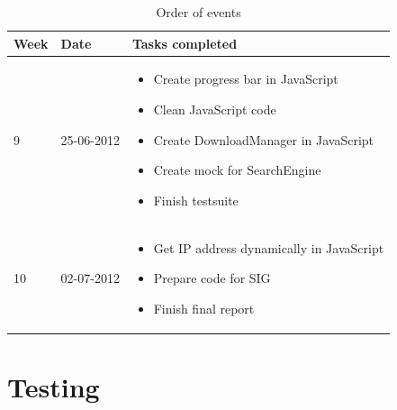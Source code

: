 \begin{table}
\centering
	\begin{tabular}{| l | l | p{8 cm} |}
		\hline
		Week & Date & Tasks completed \\
		\hline
		\hline
		9 & 25-06-2012 &		\begin{itemize}
								\item Create progress bar in JavaScript
								\item Clean JavaScript code
								\item Create DownloadManager in JavaScript
								\item Create mock for SearchEngine
								\item Finish testsuite
							\end{itemize} \\
		\hline
		10 & 02-07-2012 &	\begin{itemize}
								\item Get IP address dynamically in JavaScript
								\item Prepare code for SIG
								\item Finish final report
							\end{itemize} \\
		\hline
\end{tabular}
\caption{Order of events}
\label{tab:planning}
\end{table}


\section{Testing}

